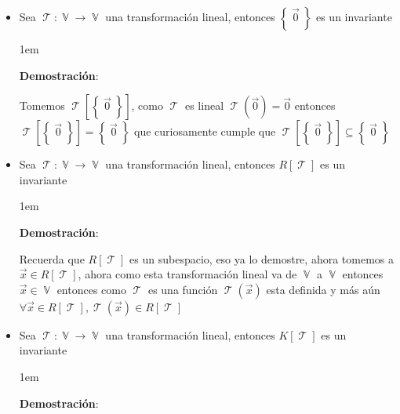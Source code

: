 \documentclass[12pt, fleqn]{report}                             %
\newenvironment{SmallIndentation}[1][0.75em]                    %
        {\begin{adjustwidth}{#1}{}\begin{footnotesize}}             %
        {\end{footnotesize}\end{adjustwidth}}                       %
\theoremstyle{break}                                            %
\DeclareMathOperator \VectorSet    {\mathbb{V}}                 %
\DeclareMathOperator \LinTrans      {\mathcal{T}}               %
\newcommand{\Set}[1]            {\left\{ \; #1 \; \right\}}     %
\begin{document}
                \begin{itemize}
                    \item Sea $\LinTrans: \VectorSet \to \VectorSet$ una transformación lineal, entonces
                        $\Set{\vec 0}$ es un invariante

                        \begin{SmallIndentation}[1em]
                            \textbf{Demostración}:
                            
                            Tomemos $\LinTrans[\Set{\vec 0}]$, como $\LinTrans$ es lineal $\LinTrans(\vec 0) = \vec 0$
                            entonces $\LinTrans[\Set{\vec 0}] = \Set{\vec 0}$ que curiosamente cumple que
                            $\LinTrans[\Set{\vec 0}] \subseteq \Set{\vec 0}$ 
                        
                        \end{SmallIndentation}

                    \item Sea $\LinTrans: \VectorSet \to \VectorSet$ una transformación lineal, entonces
                        $R[\LinTrans]$ es un invariante

                        \begin{SmallIndentation}[1em]
                            \textbf{Demostración}:
                            
                            Recuerda que $R[\LinTrans]$ es un subespacio, eso ya lo demostre, ahora tomemos 
                            a $\vec x \in R[\LinTrans]$, ahora como esta transformación lineal va de $\VectorSet$
                            a $\VectorSet$ entonces $\vec x \in \VectorSet$ entonces como $\LinTrans$
                            es una función $\LinTrans(\vec x)$ esta definida y más aún 
                            $\forall \vec x \in R[\LinTrans], \LinTrans(\vec x) \in R[\LinTrans]$
                        
                        \end{SmallIndentation}

                    \item Sea $\LinTrans: \VectorSet \to \VectorSet$ una transformación lineal, entonces
                        $K[\LinTrans]$ es un invariante

                        \begin{SmallIndentation}[1em]
                            \textbf{Demostración}:
                            

\end{SmallIndentation}
\end{itemize}
\end{document}
